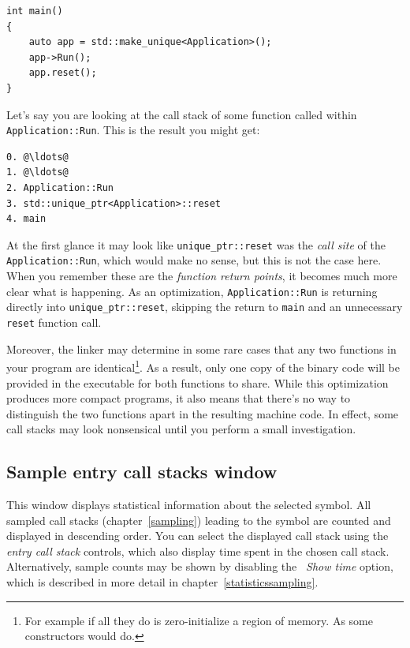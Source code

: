 \documentclass[hidelinks,titlepage,a4paper]{article}
\begin{document}
\begin{lstlisting}
int main()
{
    auto app = std::make_unique<Application>();
    app->Run();
    app.reset();
}
\end{lstlisting}

Let's say you are looking at the call stack of some function called within \texttt{Application::Run}. This is the result you might get:

\begin{lstlisting}
0. @\ldots@
1. @\ldots@
2. Application::Run
3. std::unique_ptr<Application>::reset
4. main
\end{lstlisting}

At the first glance it may look like \texttt{unique\_ptr::reset} was the \emph{call site} of the \texttt{Application::Run}, which would make no sense, but this is not the case here. When you remember these are the \emph{function return points}, it becomes much more clear what is happening. As an optimization, \texttt{Application::Run} is returning directly into \texttt{unique\_ptr::reset}, skipping the return to \texttt{main} and an unnecessary \texttt{reset} function call.

Moreover, the linker may determine in some rare cases that any two functions in your program are identical\footnote{For example if all they do is zero-initialize a region of memory. As some constructors would do.}. As a result, only one copy of the binary code will be provided in the executable for both functions to share. While this optimization produces more compact programs, it also means that there's no way to distinguish the two functions apart in the resulting machine code. In effect, some call stacks may look nonsensical until you perform a small investigation.

\subsection{Sample entry call stacks window}
\label{sampleparents}

This window displays statistical information about the selected symbol. All sampled call stacks (chapter~\ref{sampling}) leading to the symbol are counted and displayed in descending order. You can select the displayed call stack using the \emph{entry call stack} controls, which also display time spent in the chosen call stack. Alternatively, sample counts may be shown by disabling the \emph{\faStopwatch{}~Show time} option, which is described in more detail in chapter~\ref{statisticssampling}.
\end{document}
